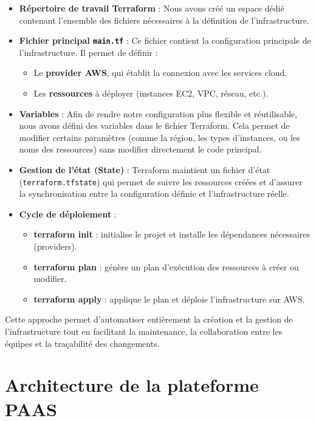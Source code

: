 \begin{itemize}
    \item \textbf{Répertoire de travail Terraform} : Nous avons créé un espace dédié contenant l’ensemble des fichiers nécessaires à la définition de l’infrastructure.

    \item \textbf{Fichier principal \texttt{main.tf}} : Ce fichier contient la configuration principale de l’infrastructure. Il permet de définir :
    \begin{itemize}
        \item Le \textbf{provider AWS}, qui établit la connexion avec les services cloud.
        \item Les \textbf{ressources} à déployer (instances EC2, VPC, réseau, etc.).
    \end{itemize}

    \item \textbf{Variables} : Afin de rendre notre configuration plus flexible et réutilisable, nous avons défini des variables dans le fichier Terraform. Cela permet de modifier certains paramètres (comme la région, les types d’instances, ou les noms des ressources) sans modifier directement le code principal.

    \item \textbf{Gestion de l’état (State)} : Terraform maintient un fichier d’état (\texttt{terraform.tfstate}) qui permet de suivre les ressources créées et d’assurer la synchronisation entre la configuration définie et l’infrastructure réelle.

    \item \textbf{Cycle de déploiement} :
    \begin{itemize}
        \item \textbf{terraform init} : initialise le projet et installe les dépendances nécessaires (providers).
        \item \textbf{terraform plan} : génère un plan d’exécution des ressources à créer ou modifier.
        \item \textbf{terraform apply} : applique le plan et déploie l’infrastructure sur AWS.
    \end{itemize}
\end{itemize}

Cette approche permet d’automatiser entièrement la création et la gestion de l’infrastructure tout en facilitant la maintenance, la collaboration entre les équipes et la traçabilité des changements.
\section{Architecture de la plateforme PAAS}

